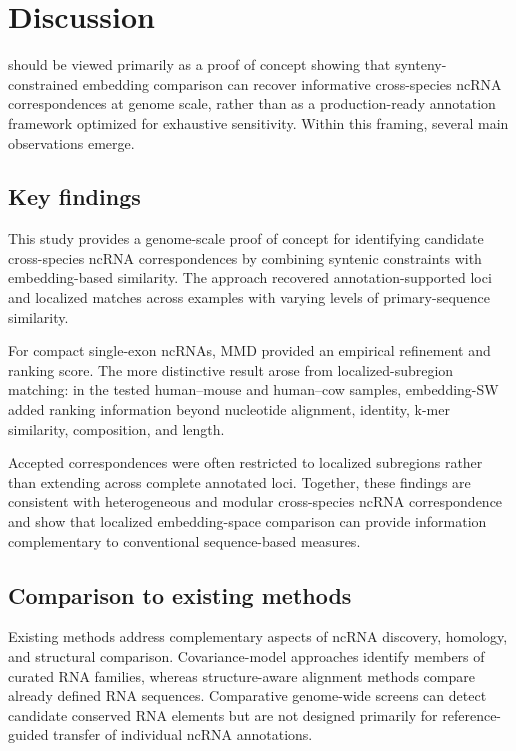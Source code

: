 \section{Discussion}
\label{sec:discussion}

\curia{} should be viewed primarily as a proof of concept showing that
synteny-constrained embedding comparison can recover informative cross-species
ncRNA correspondences at genome scale, rather than as a production-ready
annotation framework optimized for exhaustive sensitivity. Within this framing,
several main observations emerge.

\subsection{Key findings}

This study provides a genome-scale proof of concept for identifying candidate
cross-species ncRNA correspondences by combining syntenic constraints with
embedding-based similarity. The approach recovered annotation-supported loci and
localized matches across examples with varying levels of primary-sequence
similarity.

For compact single-exon ncRNAs, MMD provided an empirical refinement and ranking
score. The more distinctive result arose from localized-subregion matching: in
the tested human--mouse and human--cow samples, embedding-SW added ranking
information beyond nucleotide alignment, identity, k-mer similarity,
composition, and length.

Accepted correspondences were often restricted to localized subregions rather
than extending across complete annotated loci. Together, these findings are
consistent with heterogeneous and modular cross-species ncRNA correspondence and
show that localized embedding-space comparison can provide information
complementary to conventional sequence-based measures.

\subsection{Comparison to existing methods}

Existing methods address complementary aspects of ncRNA discovery, homology, and
structural comparison. Covariance-model approaches identify members of curated
RNA families, whereas structure-aware alignment methods compare already defined
RNA sequences. Comparative genome-wide screens can detect candidate conserved
RNA elements but are not designed primarily for reference-guided transfer of
individual ncRNA annotations.

